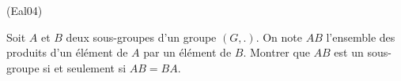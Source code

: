 \begin{tiny}(Eal04)\end{tiny} Soit $A$ et $B$ deux sous-groupes d'un groupe $(G,.)$. On note $AB$
l'ensemble des produits d'un {\'e}l{\'e}ment de $A$ par un {\'e}l{\'e}ment de $B$. Montrer que $AB$ est un sous-groupe si et seulement si $AB=BA$.